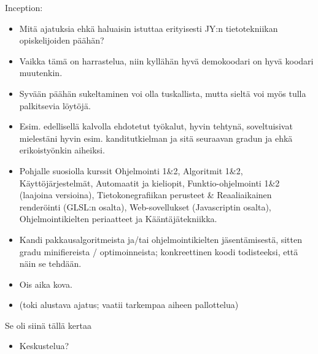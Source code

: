 \documentclass[pdf,10pt]{beamer}
\begin{document}
\begin{frame}{Inception:}
  \begin{itemize}
    \item Mitä ajatuksia ehkä haluaisin istuttaa erityisesti JY:n
      tietotekniikan opiskelijoiden päähän?
    \item Vaikka tämä on harrastelua, niin kyllähän hyvä demokoodari
      on hyvä koodari muutenkin.
    \item Syvään päähän sukeltaminen voi olla tuskallista, mutta
      sieltä voi myös tulla palkitsevia löytöjä.
    \item Esim. edellisellä kalvolla ehdotetut työkalut, hyvin tehtynä,
      soveltuisivat mielestäni hyvin esim. kanditutkielman ja sitä
      seuraavan gradun ja ehkä erikoistyönkin aiheiksi.
    \item Pohjalle suosiolla kurssit Ohjelmointi 1\&2, Algoritmit
      1\&2, Käyttöjärjestelmät, Automaatit ja kieliopit,
      Funktio-ohjelmointi 1\&2 (laajoina versioina),
      Tietokonegrafiikan perusteet \& Reaaliaikainen renderöinti
      (GLSL:n osalta), Web-sovellukset (Javascriptin osalta),
      Ohjelmointikielten periaatteet ja Kääntäjätekniikka.
    \item Kandi pakkausalgoritmeista ja/tai ohjelmointikielten
      jäsentämisestä, sitten gradu minifiereista / optimoinneista;
      konkreettinen koodi todisteeksi, että näin se tehdään.
    \item[] Ois aika kova.
    \item[] (toki alustava ajatus; vaatii tarkempaa aiheen
      pallottelua)
  \end{itemize}
\end{frame}

\begin{frame}{Se oli siinä tällä kertaa}
  \begin{itemize}
    \item Keskustelua?
  \end{itemize}
\end{frame}
\end{document}
